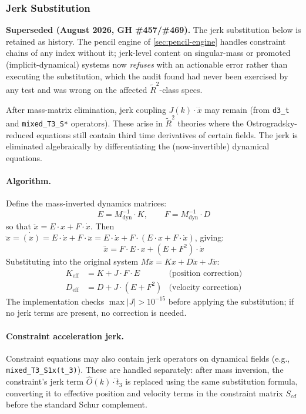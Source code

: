 \subsubsection{Jerk Substitution}
\label{sec:modal-jerk}

\textbf{Superseded (August 2026, GH \#457/\#469).} The jerk substitution
below is retained as history. The pencil engine of \cref{sec:pencil-engine}
handles constraint chains of any index without it; jerk-level content on
singular-mass or promoted (implicit-dynamical) systems now \emph{refuses}
with an actionable error rather than executing the substitution, which
the audit found had never been exercised by any test and was wrong on the
affected $\tilde R^2$-class specs.

After mass-matrix elimination, jerk coupling $J(k) \cdot \dddot{x}$ may remain (from \texttt{d3\_t} and \texttt{mixed\_T3\_S*} operators).  These arise in $\tilde{R}^2$ theories where the Ostrogradsky-reduced equations still contain third time derivatives of certain fields.  The jerk is eliminated algebraically by differentiating the (now-invertible) dynamical equations.

\paragraph{Algorithm.}
Define the mass-inverted dynamics matrices:
\begin{equation}
  E = M_{\text{dyn}}^{-1} \cdot K, \qquad F = M_{\text{dyn}}^{-1} \cdot D
\end{equation}
so that $\ddot{x} = E \cdot x + F \cdot \dot{x}$.  Then $\dddot{x} = \dot{(\ddot{x})} = E \cdot \dot{x} + F \cdot \ddot{x} = E \cdot \dot{x} + F \cdot (E \cdot x + F \cdot \dot{x})$, giving:
\begin{equation}
  \dddot{x} = F \cdot E \cdot x + (E + F^2) \cdot \dot{x}
\end{equation}
Substituting into the original system $M\ddot{x} = K x + D \dot{x} + J \dddot{x}$:
\begin{align}
  K_{\text{eff}} &= K + J \cdot F \cdot E  &\text{(position correction)} \\
  D_{\text{eff}} &= D + J \cdot (E + F^2)  &\text{(velocity correction)}
\end{align}
The implementation checks $\max|J| > 10^{-15}$ before applying the substitution; if no jerk terms are present, no correction is needed.

\paragraph{Constraint acceleration jerk.}
Constraint equations may also contain jerk operators on dynamical fields (e.g., \texttt{mixed\_T3\_S1x(t\_3)}).  These are handled separately: after mass inversion, the constraint's jerk term $\hat{O}(k) \cdot \dddot{t}_3$ is replaced using the same substitution formula, converting it to effective position and velocity terms in the constraint matrix $S_{cd}$ before the standard Schur complement.

